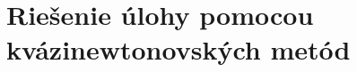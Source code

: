 \documentclass[report.tex]{subfiles}
\begin{document}
   

\section{Riešenie úlohy pomocou kvázinewtonovských metód}\label{sec:CD}
\end{document}
